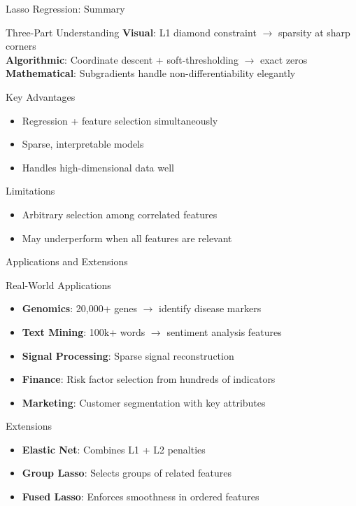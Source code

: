 \documentclass{beamer}
\begin{document}
\begin{frame}{Lasso Regression: Summary}
\begin{theorembox}{Three-Part Understanding}
\textbf{Visual}: L1 diamond constraint $\to$ sparsity at sharp corners \\
\textbf{Algorithmic}: Coordinate descent + soft-thresholding $\to$ exact zeros \\
\textbf{Mathematical}: Subgradients handle non-differentiability elegantly
\end{theorembox}

\begin{keypointsbox}{Key Advantages}
{\small
\begin{itemize}
\item Regression + feature selection simultaneously
\item Sparse, interpretable models
\item Handles high-dimensional data well
\end{itemize}
}
\end{keypointsbox}

\begin{keypointsbox}{Limitations}
{\small
\begin{itemize}
\item Arbitrary selection among correlated features
\item May underperform when all features are relevant
\end{itemize}
}
\end{keypointsbox}
\end{frame}

\begin{frame}{Applications and Extensions}
\begin{examplebox}{Real-World Applications}
{\small
\begin{itemize}
\item \textbf{Genomics}: 20,000+ genes $\to$ identify disease markers
\item \textbf{Text Mining}: 100k+ words $\to$ sentiment analysis features
\item \textbf{Signal Processing}: Sparse signal reconstruction
\item \textbf{Finance}: Risk factor selection from hundreds of indicators
\item \textbf{Marketing}: Customer segmentation with key attributes
\end{itemize}
}
\end{examplebox}

\begin{keypointsbox}{Extensions}
{\small
\begin{itemize}
\item \textbf{Elastic Net}: Combines L1 + L2 penalties
\item \textbf{Group Lasso}: Selects groups of related features
\item \textbf{Fused Lasso}: Enforces smoothness in ordered features
\end{itemize}
}
\end{keypointsbox}
\end{frame}
\end{document}

